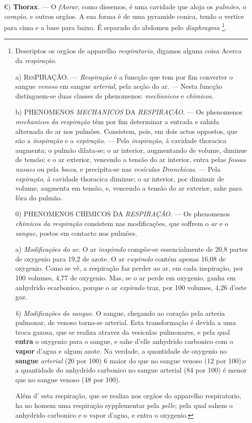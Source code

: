 €) \textbf{Thorax}. --- O \emph{fAorar}, como dissemos, é uma cavidade que aloja os \emph{pulmões}, o \emph{coração}, e outros orgãos. A sua forma é de uma pyramide conica, tendo o vertice para cima e a base para baixo. É separado do abdomen pelo \emph{diaphragma} \footnote{Deseriptos os orgãos de apparelho \emph{respiratorio}, digamos alguna coisa Acerca da \emph{respiração}.\par a) \textsc{ResPIRAÇÃO}. --- \emph{Respiração} é a funcção que tem por fim converter o sangue \emph{venoso} em sangue \emph{arterial}, pela acção do ar. --- Nesta funcção distinguem-se duas classes de phenomenos: \emph{meclianicos} e \emph{chimicos}.\par b) PHENOMENOS \emph{MECHANICOS} DA \emph{RESPIRAÇÃO}. --- Os phenomenos \emph{mechanicos da respiração} têm por fim determinar a entrada e sahida alternada do ar nos pulmões. Consistem, pois, em dois actos oppostos, que são a \emph{inspiração} e a \emph{expiração}. --- Pela \emph{inspiração}, á cavidade thoracica augmenta; o pulmão dilata-se; o ar interior, augmentando de volume, diminue de tensão; e o ar exterior, vencendo a tensão do ar interior, entra pelas \emph{fossas nasaes} ou pela \emph{bocca}, e precipita-se nas \emph{vesículas Dronchicas}. --- Pela \emph{expiração}, á cavidade thoracica diminue; o ar interior, por diminuir de volume, augmenta em tensão, e, vencendo a tensão do ar exterior, sahe para fóra do pulmão.\par 0) PHENOMENOS CHIMICOS DA \emph{RESPIRAÇÃO}. --- Os phenomenos \emph{chimicos da respiração} consistem nas modificações, que soffrem o \emph{ar} e o \emph{sangue}, postos em contacto nos pulmões.\par a) \emph{Modificações do ar}. O ar \emph{inspirado} compõe-se essencialmente de 20,8 partes de oxygenio para 19,2 de azote. O ar \emph{ewpirado} contém apenas 16,08 de oxygenio. Como se vê, a respiração faz perder ao ar, em cada inspiração, por 100 volumes, 4,77 de oxygenio. Mas, se o ar perde em oxygenio, ganha em anhydrido ecarbonico, porque o ar \emph{expirado} traz, por 100 volumes, 4,26 d'este gaz.\par \emph{b}) \emph{Modificações do sangue}. O sangue, chegando ao coração pela arteria pulmonar, de venoso torna-se arterial. Esta transformação é devida a uma troca gazosa, que se realiza atravez da vesicnlas pulmonares, e pela qual \textbf{entra} o oxygenio para o sangue, e sahe d'elle anhydrido carbonico com o \textbf{vapor} d'agua e algum azote. Na verdade, a quantidade de oxygenio no \textbf{sangue} \emph{arterial} (20 por 100) 6 maior do que no sangue venoso (12 por 100);e a quantidade do anhydrido carbonico no sangue arterial (84 por 100) é menor que no sangue venoso (48 por 100).\par Além d' esta respiração, que se realiza nos orgãos do apparelho respiratorio, ha no homem uma respiração sypplementar pela \emph{pelle}; pela qual sahem o anhydrido carbonico e o vapor d'agua, e entra o oxygenio.}.

